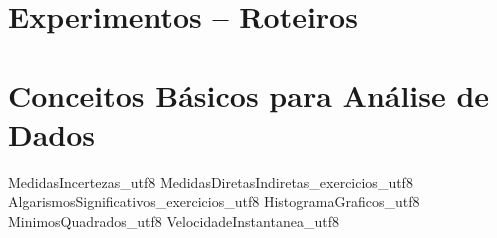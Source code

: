 \documentclass[12pt,a4paper,]{book}
\begin{document}

%

\tableofcontents


%



\part{Experimentos -- Roteiros}



\part[Conceitos Básicos para Análise de Dados]{Conceitos Básicos para Análise de Dados}
 {MedidasIncertezas_utf8}
 {MedidasDiretasIndiretas_exercicios_utf8}
 {AlgarismosSignificativos_exercicios_utf8}
 {HistogramaGraficos_utf8}
 {MinimosQuadrados_utf8}
 {VelocidadeInstantanea_utf8}

%

%
%
%
%
%
%
%

%
%
\end{document}
